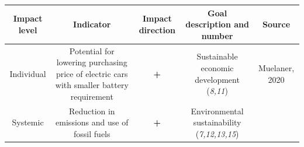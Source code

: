 \documentclass[
]{book}
\begin{document}
\begin{longtable}[]{@{}ccccc@{}}
\toprule
\begin{minipage}[b]{0.17\columnwidth}\centering
Impact level\strut
\end{minipage} & \begin{minipage}[b]{0.16\columnwidth}\centering
Indicator\strut
\end{minipage} & \begin{minipage}[b]{0.17\columnwidth}\centering
Impact direction\strut
\end{minipage} & \begin{minipage}[b]{0.17\columnwidth}\centering
Goal description and number\strut
\end{minipage} & \begin{minipage}[b]{0.17\columnwidth}\centering
Source\strut
\end{minipage}\tabularnewline
\midrule
\endhead
\begin{minipage}[t]{0.17\columnwidth}\centering
Individual\strut
\end{minipage} & \begin{minipage}[t]{0.16\columnwidth}\centering
Potential for lowering purchasing price of electric cars with smaller battery requirement\strut
\end{minipage} & \begin{minipage}[t]{0.17\columnwidth}\centering
\textbf{+}\strut
\end{minipage} & \begin{minipage}[t]{0.17\columnwidth}\centering
Sustainable economic development (\emph{8,11})\strut
\end{minipage} & \begin{minipage}[t]{0.17\columnwidth}\centering
Muelaner, 2020\strut
\end{minipage}\tabularnewline
\begin{minipage}[t]{0.17\columnwidth}\centering
Systemic\strut
\end{minipage} & \begin{minipage}[t]{0.16\columnwidth}\centering
Reduction in emissions and use of fossil fuels\strut
\end{minipage} & \begin{minipage}[t]{0.17\columnwidth}\centering
\textbf{+}\strut
\end{minipage} & \begin{minipage}[t]{0.17\columnwidth}\centering
Environmental sustainability (\emph{7,12,13,15})\strut
\end{minipage} & \begin{minipage}[t]{0.17\columnwidth}\centering

\end{minipage}
\end{longtable}
\end{document}
